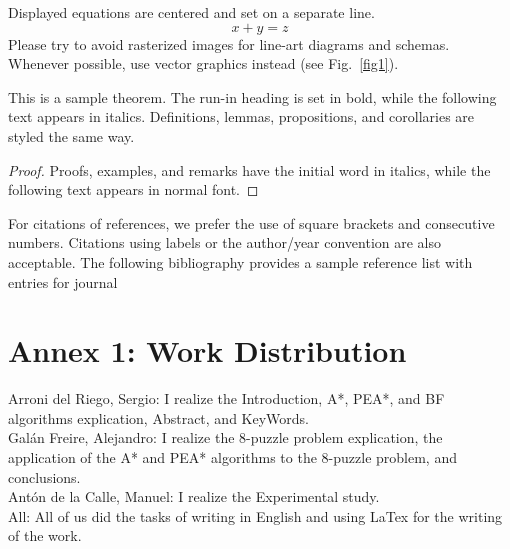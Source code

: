 \documentclass[runningheads]{llncs}
\begin{document}
\noindent Displayed equations are centered and set on a separate
line.
\begin{equation}
x + y = z
\end{equation}
Please try to avoid rasterized images for line-art diagrams and
schemas. Whenever possible, use vector graphics instead (see
Fig.~\ref{fig1}).

\begin{theorem}
This is a sample theorem. The run-in heading is set in bold, while
the following text appears in italics. Definitions, lemmas,
propositions, and corollaries are styled the same way.
\end{theorem}
%
%
\begin{proof}
Proofs, examples, and remarks have the initial word in italics,
while the following text appears in normal font.
\end{proof}
For citations of references, we prefer the use of square brackets
and consecutive numbers. Citations using labels or the author/year
convention are also acceptable. The following bibliography provides
a sample reference list with entries for journal
%
%
%
% 
% 
%

 
 
\appendix
\chapter*{Annex 1: Work Distribution}
Arroni del Riego, Sergio: I realize the Introduction, A*, PEA*, and BF algorithms explication, Abstract, and KeyWords.\\
Galán Freire, Alejandro: I realize the 8-puzzle problem explication, the application of the A* and PEA* algorithms to the 8-puzzle problem, and conclusions.\\
Antón de la Calle, Manuel: I realize the Experimental study.\\
All: All of us did the tasks of writing in English and using LaTex for the writing of the work.
\end{document}
